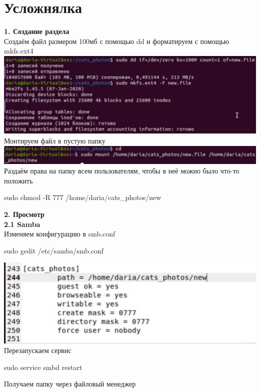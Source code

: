 \documentclass[12pt,a4paper]{scrartcl}
\begin{document}
\section{Усложнялка} 
\textnumero \textbf{1. Создание раздела}\\[5pt]
Создаём файл размером 100мб с помощью dd и форматируем с помощью mkfs.ext4 \\[5pt]
\includegraphics[scale=10, width=15cm]{f10} \\[5pt]
Монтируем файл в пустую папку \\[5pt]
\includegraphics[scale=10, width=15cm]{f11} \\[5pt]
Раздаём права на папку всем пользователям, чтобы в неё можно было что-то положить
\begin{center}
sudo chmod -R 777 /home/daria/cats\_photos/new
\end{center}
\textnumero \textbf{2. Просмотр} \\[5pt]
\textnumero \textbf{2.1 Samba} \\[5pt]
Изменяем конфигурацию в smb.conf \\[5pt]
\begin{center}
sudo gedit /etc/samba/smb.conf 
\end{center}
\includegraphics[scale=10, width=15cm]{f12}\\
Перезапускаем сервис \\[5pt]
\begin{center}
sudo service smbd restart
\end{center}
Получаем папку через файловый менеджер \\[5pt]
\end{document}
